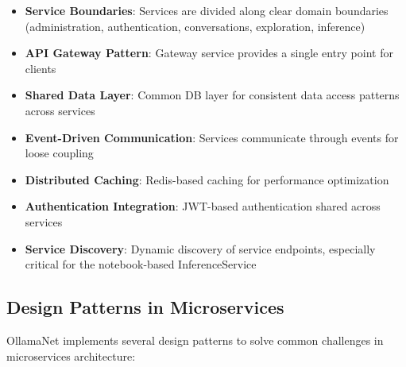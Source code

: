 \begin{itemize}
    \item \textbf{Service Boundaries}: Services are divided along clear domain boundaries (administration, authentication, conversations, exploration, inference)
    \item \textbf{API Gateway Pattern}: Gateway service provides a single entry point for clients
    \item \textbf{Shared Data Layer}: Common DB layer for consistent data access patterns across services
    \item \textbf{Event-Driven Communication}: Services communicate through events for loose coupling
    \item \textbf{Distributed Caching}: Redis-based caching for performance optimization
    \item \textbf{Authentication Integration}: JWT-based authentication shared across services
    \item \textbf{Service Discovery}: Dynamic discovery of service endpoints, especially critical for the notebook-based InferenceService
\end{itemize}


\subsection{Design Patterns in Microservices}

OllamaNet implements several design patterns to solve common challenges in microservices architecture:

